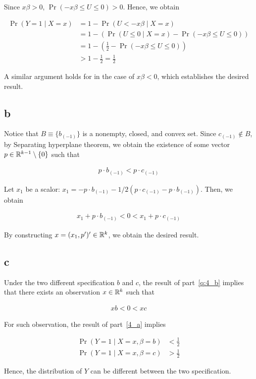 \documentclass[11pt]{article}
\begin{document}
Since $x\beta > 0$, $\Pr(- x\beta \leq U \leq 0) > 0$. Hence, we obtain

\begin{align*}
    \Pr(Y = 1 \mid X = x)
    &= 1 - \Pr(U < - x\beta \mid X = x) \\
    &= 1 - \left( \Pr(U \leq 0 \mid X = x) - \Pr(- x\beta \leq U \leq 0) \right) \\
    &= 1 - \left( \frac{1}{2} - \Pr(- x\beta \leq U \leq 0) \right) \\
    &> 1 - \frac{1}{2} = \frac{1}{2}
\end{align*}

A similar argument holds for in the case of $x\beta < 0$, which establishes the desired result.

\subsection*{b}\label{q:4_b}

Notice that $B \equiv \{b_{(-1)}\}$ is a nonempty, closed, and convex set. Since $c_{(-1)} \notin B$, by Separating hyperplane theorem, we obtain the existence of some vector $p \in \mathbb{R}^{k-1}\setminus \{0\}$ such that

\begin{align*}
    p \cdot b_{(-1)} < p \cdot c_{(-1)}
\end{align*}

Let $x_1$ be a scalor: $x_1 = - p \cdot b_{(-1)} - 1/2 (p\cdot c_{(-1)} - p \cdot b_{(-1)})$. Then, we obtain

\begin{align*}
    x_1 + p \cdot b_{(-1)} < 0 < x_1 + p \cdot c_{(-1)}
\end{align*}

By constructing $x = (x_1, p^\prime)^\prime \in \mathbb{R}^k$, we obtain the desired result.

\subsection*{c}

Under the two different specification $b$ and $c$, the result of part~\ref{q:4_b} implies that there exists an observation $x \in \mathbb{R}^k$ such that

\begin{align*}
    xb < 0 < xc
\end{align*}

For such observation, the result of part~\ref{4_a} implies

\begin{align*}
    \Pr(Y = 1 \mid X = x, \beta = b) &< \frac{1}{2} \\
    \Pr(Y = 1 \mid X = x, \beta = c) &> \frac{1}{2}
\end{align*}

Hence, the distribution of $Y$ can be different between the two specification.
\end{document}
